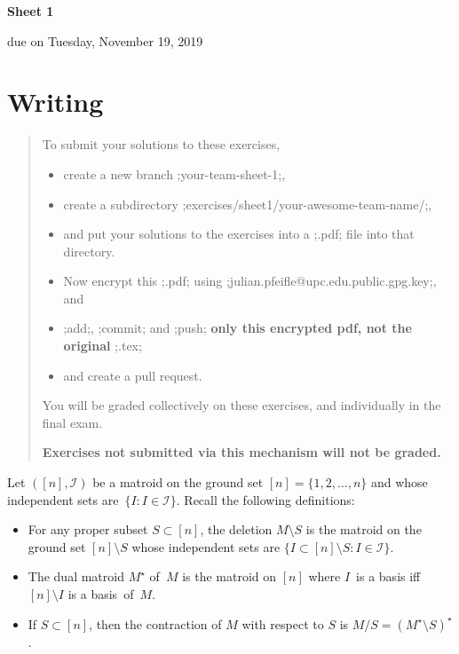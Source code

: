 \documentclass[11pt]{amsart}
\newcommand{\defn}[1]{{\color{blue}#1}}
\newcommand{\alert}[1]{\textbf{\color{red}#1}}
\begin{document}
\newpage
\begin{center}
  \textbf{\sffamily Sheet 1}

 \bigskip
\bigskip
\bigskip
due on Tuesday, November 19, 2019
\end{center}

\bigskip

\section*{Writing}

\bigskip

\begin{quote}\small
  To submit your solutions to these exercises,
  \begin{itemize}[$\quad\triangleright$]
  \item create a new branch ;your-team-sheet-1;,
  \item create a subdirectory ;exercises/sheet1/your-awesome-team-name/;,
  \item and put your solutions to the exercises into a ;.pdf; file into that directory.
  \item Now encrypt this ;.pdf; using ;julian.pfeifle@upc.edu.public.gpg.key;, and
  \item ;add;, ;commit; and ;push; \alert{only this encrypted pdf, not the original} ;.tex;
  \item and create a pull request.
  \end{itemize}
  You will be graded collectively on these exercises, and individually in the final exam.

  \alert{Exercises not submitted via this mechanism will not be graded.}
\end{quote}

\bigskip

Let $([n],\mathcal I)$ be a matroid on the ground set $[n]=\{1,2,\dots,n\}$ and whose independent sets are~$\{I:I\in\mathcal I\}$.
Recall the following definitions:

\begin{itemize}[$\triangleright$]
\item
  For any proper subset $S\subset[n]$, the \defn{deletion}
  $M\setminus S$ is the matroid on the ground set $[n]\setminus S$ whose
  independent sets are $\{I\subset[n]\setminus S : I\in\mathcal I\}$.

\item
  The \defn{dual matroid} $M^\star$ of~$M$ is the matroid on $[n]$ where $I$~is a basis iff $[n]\setminus I$ is a basis~of~$M$.

\item
  If $S\subset[n]$, then the \defn{contraction} of $M$ with respect to $S$ is $M/S = (M^\star\setminus S)^\star$.
  
\end{itemize}
\end{document}
